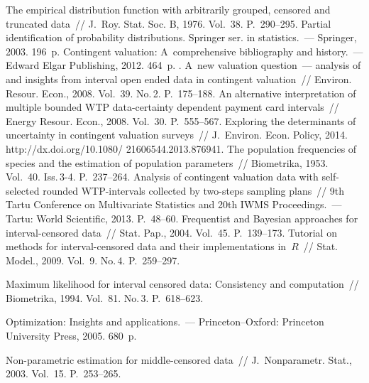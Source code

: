 \begin{multicols}{2}
{{\begin{thebibliography}{99}
The empirical distribution function with arbitrarily grouped,
censored and truncated data~// J.~Roy. Stat. Soc. B, 1976. Vol.~38. P.~290--295.
{Partial identification of probability distributions.} Springer ser.
in statistics.~--- Springer, 2003. 196~p.
{Contingent valuation: A~comprehensive bibliography and history}.~---
Edward Elgar Publishing, 2012.  464~p.
. 
A~new valuation question~--- analysis of and insights from interval
 open ended data in contingent valuation~// 
{Environ. Resour. Econ.}, 2008.  Vol.~39. No.\,2. P.~175--188.
An alternative interpretation of multiple
bounded WTP data-certainty dependent payment card intervals~//
{Energy Resour. Econ.},   2008. Vol.~30. P.~555--567.
Exploring the determinants of uncertainty in contingent valuation surveys~//
{J.~Environ. Econ. Policy}, 2014.  
{\sf http://dx.doi.org/10.1080/ 21606544.2013.876941}.
The population frequencies of species and the estimation of population
parameters~// {Biometrika}, 1953. Vol.~40. Iss.\,3-4. P.~237--264.
Analysis of contingent valuation data
with self-selected rounded WTP-intervals collected by two-steps sampling plans~//
9th Tartu Conference on Multivariate Statistics and 20th IWMS Proceedings.~--- 
Tartu: World Scientific, 2013. P.~48--60.
  Frequentist and Bayesian approaches for
interval-censored data~// {Stat. Pap.}, 2004. Vol.~45. P.~139--173.
Tutorial on methods for interval-censored
data and their implementations in~$R$~// {Stat. Model.}, 2009. 
Vol.~9. No.\,4. P.~259--297.

Maximum likelihood for interval censored data:
Consistency and computation~// {Biometrika}, 1994.  Vol.~81. No.\,3. P.~618--623.

{Optimization: Insights and applications.}~---
Princeton--Oxford: Princeton University Press,
2005.  680~p.

Non-parametric estimation for middle-censored data~//
{J.~Nonparametr. Stat.}, 2003.  Vol.~15. P.~253--265.


\end{thebibliography}}}
\end{multicols}
